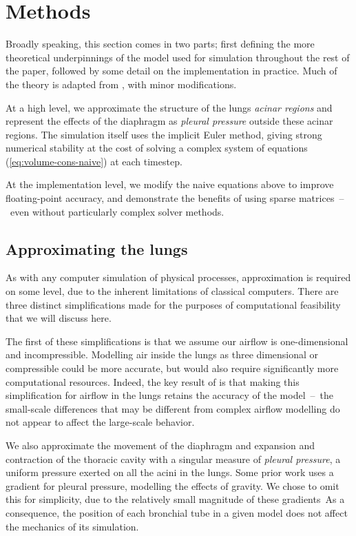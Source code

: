 %
\section{Methods}

Broadly speaking, this section comes in two parts; first defining the more theoretical underpinnings
of the model used for simulation throughout the rest of the paper, followed by some detail on the
implementation in practice. Much of the theory is adapted from \cite{Foy2018}, with minor
modifications.

At a high level, we approximate the structure of the lungs \textit{acinar regions} and represent the
effects of the diaphragm as \textit{pleural pressure} outside these acinar regions. The simulation
itself uses the implicit Euler method, giving strong numerical stability at the cost of solving a
complex system of equations (\autoref{eq:volume-cons-naive}) at each timestep.

At the implementation level, we modify the naive equations above to improve floating-point accuracy,
and demonstrate the benefits of using sparse matrices~--~even without particularly complex solver
methods.

\subsection{Approximating the lungs} \label{sec:approximating-lungs}

As with any computer simulation of physical processes, approximation is required on some level, due
to the inherent limitations of classical computers. There are three distinct simplifications made
for the purposes of computational feasibility that we will discuss here.

The first of these simplifications is that we assume our airflow is one-dimensional and
incompressible. Modelling air inside the lungs as three dimensional or compressible could be more
accurate, but would also require significantly more computational resources. Indeed, the key result
of \cite{Foy2018} is that making this simplification for airflow in the lungs retains the accuracy
of the model~--~the small-scale differences that may be different from complex airflow modelling do
not appear to affect the large-scale behavior.

We also approximate the movement of the diaphragm and expansion and contraction of the thoracic
cavity with a singular measure of \textit{pleural pressure}, a uniform pressure exerted on all the
acini in the lungs. Some prior work uses a gradient for pleural pressure, modelling the effects of
gravity. We chose to omit this for simplicity, due to the relatively small magnitude of these
gradients\footnotemark\ As a consequence, the position of each bronchial tube in a given model does
not affect the mechanics of its simulation.

